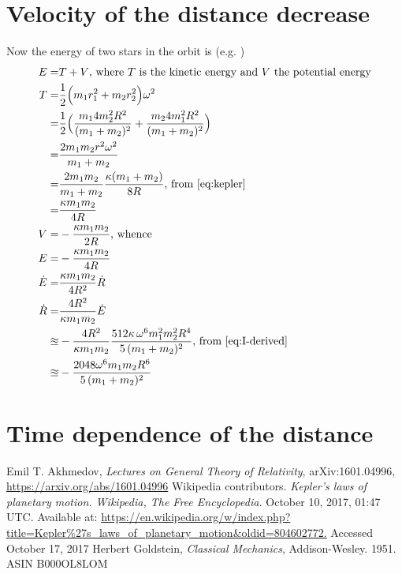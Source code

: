 \documentclass[]{article}
\begin{document}
\section{Velocity of the distance decrease}
Now the energy of two stars in the orbit is (e.g. \cite{goldstein})
\begin{align*}
E=& T + V\text{, where $T$ is the kinetic energy and $V$ the potential energy}\\
T=&\frac{1}{2}\Big(m_1r_1^2+m_2r_2^2\Big) \omega^2\\
=& \frac{1}{2}\Big(\frac{m_1 4m_2^2R^2}{(m_1+m_2)^2}+\frac{m_2 4m_1^2R^2}{(m_1+m_2)^2}\Big)\\
=&\frac{2 m_1 m_2 r^2 \omega^2}{m_1 + m_2}\\
=& \frac{2 m_1 m_2}{m_1 + m_2} \frac{\kappa (m_1 + m_2)}{8 R}\text{, from \eqref{eq:kepler}}\\
=& \frac{\kappa m_1 m_2}{4R} \\
V=& - \frac{\kappa m_1 m_2}{2 R} \text{, whence}\\
E=&-\frac{\kappa m_1 m_2}{4R} \\
\dot{E} =& \frac{\kappa m_1 m_2}{4R^2}\dot{R}\\
\dot{R}=& \frac{4 R^2}{\kappa m_1 m_2} \dot{E} \\
\approxeq& - \frac{4 R^2}{\kappa m_1 m_2} \frac{512\kappa\, \omega^6 m_1^2 m_2^2 R^4}{5\,(m_1 + m_2)^2} \text{, from \eqref{eq:I-derived}}\\
\approxeq& - \frac{2048 \omega^6 m_1 m_2 R^6}{5\,(m_1 + m_2)^2}
\end{align*}
\section{Time dependence of the distance}


\begin{thebibliography}{9}
	Emil T. Akhmedov,
	\emph{Lectures on General Theory of Relativity},
 	arXiv:1601.04996,
 	\url{https://arxiv.org/abs/1601.04996}
 	Wikipedia contributors.
 	\emph{Kepler's laws of planetary motion. Wikipedia, The Free Encyclopedia.}  October 10, 2017, 01:47 UTC. Available at: 
 	\url{https://en.wikipedia.org/w/index.php?title=Kepler%27s_laws_of_planetary_motion&oldid=804602772.} Accessed
 	October 17, 2017
 	Herbert Goldstein,
 	\emph{Classical Mechanics},
 	 Addison-Wesley. 1951.
 	 ASIN B000OL8LOM
\end{thebibliography}
\end{document}
